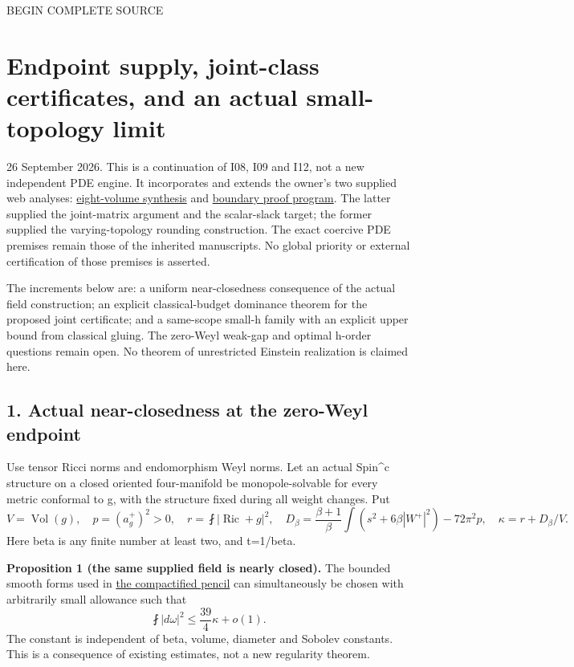 \documentclass[
  10pt,
]{article}
\begin{document}
BEGIN COMPLETE SOURCE

\hypertarget{endpoint-supply-joint-class-certificates-and-an-actual-small-topology-limit}{%
\section{Endpoint supply, joint-class certificates, and an actual
small-topology
limit}\label{endpoint-supply-joint-class-certificates-and-an-actual-small-topology-limit}}

26 September 2026. This is a continuation of I08, I09 and I12, not a new
independent PDE engine. It incorporates and extends the owner's two
supplied web analyses:
\href{../guidance/source/20260926_web_eight_volume_synthesis.zh.md}{eight-volume
synthesis} and
\href{../guidance/source/20260926_web_boundary_proof_program.zh.md}{boundary
proof program}. The latter supplied the joint-matrix argument and the
scalar-slack target; the former supplied the varying-topology rounding
construction. The exact coercive PDE premises remain those of the
inherited manuscripts. No global priority or external certification of
those premises is asserted.

The increments below are: a uniform near-closedness consequence of the
actual field construction; an explicit classical-budget dominance
theorem for the proposed joint certificate; and a same-scope small-h
family with an explicit upper bound from classical gluing. The zero-Weyl
weak-gap and optimal h-order questions remain open. No theorem of
unrestricted Einstein realization is claimed here.

\hypertarget{actual-near-closedness-at-the-zero-weyl-endpoint}{%
\subsection{1. Actual near-closedness at the zero-Weyl
endpoint}\label{actual-near-closedness-at-the-zero-weyl-endpoint}}

Use tensor Ricci norms and endomorphism Weyl norms. Let an actual
Spin\^{}c structure on a closed oriented four-manifold be
monopole-solvable for every metric conformal to g, with the structure
fixed during all weight changes. Put \[
 V=\operatorname{Vol}(g),\quad p=(a_g^+)^2>0,\quad
 r=\fint|\operatorname{Ric}+g|^2,\quad
 D_\beta=\frac{\beta+1}{\beta}\int(s^2+6\beta|W^+|^2)-72\pi^2p,
 \quad \kappa=r+D_\beta/V.
\] Here beta is any finite number at least two, and t=1/beta.

\textbf{Proposition 1 (the same supplied field is nearly closed).} The
bounded smooth forms used in
\href{../mathematics/current/line1_compactified_pencil.md}{the
compactified pencil} can simultaneously be chosen with arbitrarily small
allowance such that \[
 \fint|d\omega|^2\le\frac{39}{4}\kappa+o(1).                 \tag{1.1}
\] The constant is independent of beta, volume, diameter and Sobolev
constants. This is a consequence of existing estimates, not a new
regularity theorem.
\end{document}
